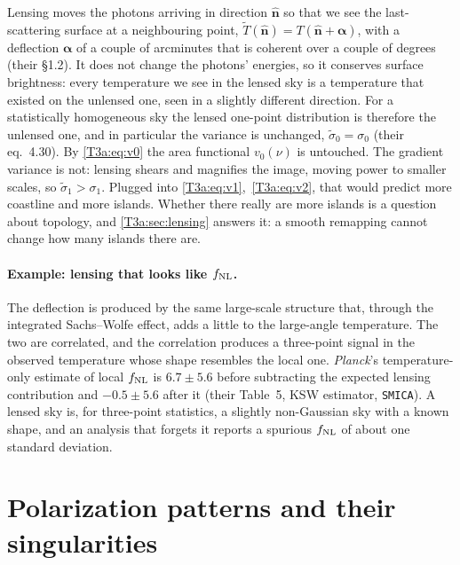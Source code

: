 Lensing moves the photons arriving in direction $\hat{\bm n}$ so that we see the last-scattering surface at a neighbouring point, $\tilde T(\hat{\bm n})=T(\hat{\bm n}+\bm\alpha)$, with a deflection $\bm\alpha$ of a couple of arcminutes that is coherent over a couple of degrees \cite{LewisChallinor2006} (their \S1.2). It does not change the photons' energies, so it conserves surface brightness: every temperature we see in the lensed sky is a temperature that existed on the unlensed one, seen in a slightly different direction. For a statistically homogeneous sky the lensed one-point distribution is therefore the unlensed one, and in particular the variance is unchanged, $\tilde\sigma_0=\sigma_0$ (their eq.~4.30). By \eqref{T3a:eq:v0} the area functional $v_0(\nu)$ is untouched. The gradient variance is not: lensing shears and magnifies the image, moving power to smaller scales, so $\tilde\sigma_1>\sigma_1$. Plugged into \eqref{T3a:eq:v1},~\eqref{T3a:eq:v2}, that would predict more coastline and more islands. Whether there really are more islands is a question about topology, and \cref{T3a:sec:lensing} answers it: a smooth remapping cannot change how many islands there are.

\paragraph{Example: lensing that looks like $f_{\rm NL}$.} The deflection is produced by the same large-scale structure that, through the integrated Sachs--Wolfe effect, adds a little to the large-angle temperature. The two are correlated, and the correlation produces a three-point signal in the observed temperature whose shape resembles the local one. \textit{Planck}'s temperature-only estimate of local $f_{\rm NL}$ is $6.7\pm5.6$ before subtracting the expected lensing contribution and $-0.5\pm5.6$ after it \cite{Planck2018IX} (their Table~5, KSW estimator, \texttt{SMICA}). A lensed sky is, for three-point statistics, a slightly non-Gaussian sky with a known shape, and an analysis that forgets it reports a spurious $f_{\rm NL}$ of about one standard deviation.
\section{Polarization patterns and their singularities}
\label{T3a:sec:polarization}

